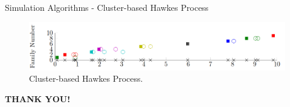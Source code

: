 \documentclass[11pt]{beamer}
\theoremstyle{example}
\begin{document}
\begin{frame}{Simulation Algorithms - Cluster-based Hawkes Process}
	\begin{figure}[H]
		\centering
		\includegraphics[scale=.45]{hawkescluser}
		\caption{Cluster-based Hawkes Process.}
	\end{figure}
\end{frame}

\begin{frame}
	\begin{center}
		\Huge{\textbf{THANK YOU!}}
	\end{center}	
\end{frame}
\end{document}
